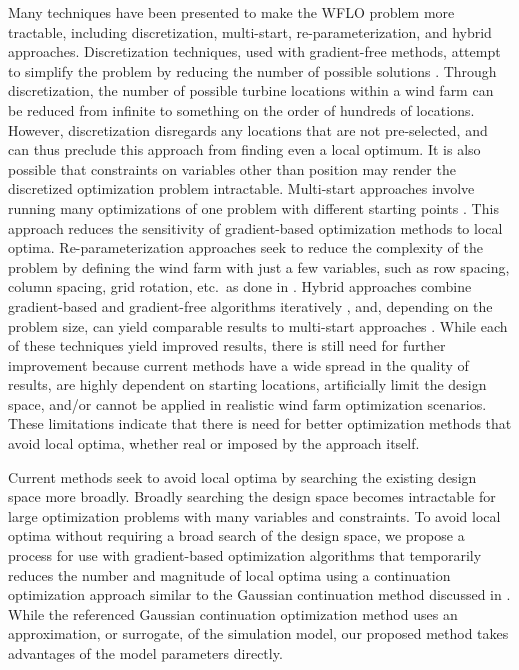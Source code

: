 \documentclass[journal abbreviation, manuscript]{copernicus}
\begin{document}
	Many techniques have been presented to make the WFLO problem more tractable, including discretization, multi-start, re-parameterization, and hybrid approaches. Discretization techniques, used with gradient-free methods, attempt to simplify the problem by reducing the number of possible solutions \cite{mosetti1994, grady2005}. Through discretization, the number of possible turbine locations within a wind farm can be reduced from infinite to something on the order of hundreds of locations. However, discretization disregards any locations that are not pre-selected, and can thus preclude this approach from finding even a local optimum. It is also possible that constraints on variables other than position may render the discretized optimization problem intractable. Multi-start approaches involve running many optimizations of one problem with different starting points \cite{gonzalez2014}. This approach reduces the sensitivity of gradient-based optimization methods to local optima. Re-parameterization approaches seek to reduce the complexity of the problem by defining the wind farm with just a few variables, such as row spacing, column spacing, grid rotation, etc.~as done in \cite{stanley2020}. Hybrid approaches combine gradient-based and gradient-free algorithms iteratively \cite{rethore2014,graf2016, mittal2017}, and, depending on the problem size, can yield comparable results to multi-start approaches \cite{rethore2014}. While each of these techniques yield improved results, there is still need for further improvement because current methods have a wide spread in the quality of results, are highly dependent on starting locations, artificially limit the design space, and/or cannot be applied in realistic wind farm optimization scenarios. These limitations indicate that there is need for better optimization methods that avoid local optima, whether real or imposed by the approach itself.
	
	Current methods seek to avoid local optima by searching the existing design space more broadly. Broadly searching the design space becomes intractable for large optimization problems with many variables and constraints. To avoid local optima without requiring a broad search of the design space, we propose a process for use with gradient-based optimization algorithms that temporarily reduces the number and magnitude of local optima using a continuation optimization approach similar to the Gaussian continuation method discussed in \cite{mobahi2015}. While the referenced Gaussian continuation optimization method uses an approximation, or surrogate, of the simulation model, our proposed method takes advantages of the model parameters directly. 
	
\end{document}
